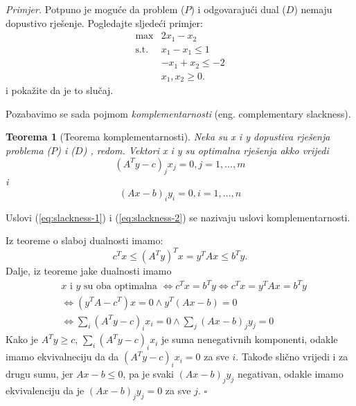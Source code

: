 \documentclass[a4paper, utf8, 11pt, colorlinks]{article}
\newtheorem{thm}{Teorema}
\newenvironment{proof}{{Dokaz:}}{\hfill$\square$}
\begin{document}
\emph{Primjer.} Potpuno je moguće da problem ($P$) i odgovarajući dual ($D$) nemaju dopustivo rješenje. Pogledajte sljedeći primjer:
$$\begin{array}{cc}
    \max                      & 2 x_1 - x_2 \\
     \mbox{s.t. }      & x_1 - x_1 \leq 1 \\
                              & -x_1 + x_2 \leq -2 \\
                             & x_1, x_2 \geq 0.
\end{array}$$
i pokažite da je to slučaj.

Pozabavimo se sada pojmom \emph{komplementarnosti} (eng. complementary slackness). 
\begin{thm}[Teorema komplementarnosti]
      Neka su x i y dopustiva rješenja problema ($P$) i  ($D$) , redom. Vektori x i y su optimalna rješenja akko vrijedi 
      \begin{equation}\label{eq:slackness-1}
           (A^Ty - c)_j x_j = 0, j=1,\ldots,m
      \end{equation} i
      \begin{equation}\label{eq:slackness-2}
           (Ax - b)_i y_i = 0, i=1,\ldots,n
      \end{equation}
\end{thm}
Uslovi (\ref{eq:slackness-1}) i (\ref{eq:slackness-2}) se nazivaju uslovi komplementarnosti.

\begin{proof}
         Iz teoreme o slaboj dualnosti imamo: 
         \begin{equation}
             c^Tx \leq ( A^T y)^T x = y^T A x \leq b^T y. 
         \end{equation}
         Dalje, iz teoreme jake dualnosti imamo  
         \begin{align*}
             &x \mbox{ i } y \mbox{ su oba optimalna } \Longleftrightarrow c^T x = b^T y \Longleftrightarrow c^Tx = y^TA x = b^Ty \\
             &\Longleftrightarrow (y^T A - c^T) x = 0 \wedge y^T(Ax - b )  = 0\\
             & \Longleftrightarrow \sum_i (A^T y - c)_i x_i = 0 \wedge \sum_j (Ax - b)_j y_j = 0
         \end{align*}
         Kako je $A^Ty \geq c$, $\sum_i (A^T y - c)_i x_i$ je suma nenegativnih komponenti, odakle imamo ekvivalneciju da  da   $(A^T y - c)_i x_i= 0$ za sve $i$. Takođe slično vrijedi i za drugu sumu, jer $Ax - b \leq 0$, pa je svaki  $(Ax - b)_j y_j$ negativan, odakle imamo ekvivalenciju da je $(Ax - b)_j y_j = 0$ za sve $j$.
\end{proof}
\end{document}
